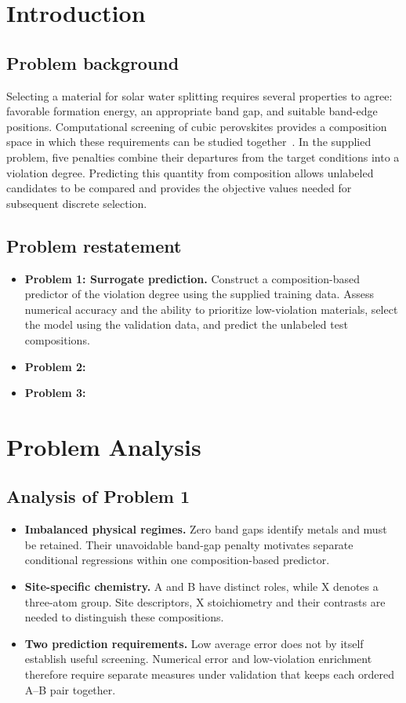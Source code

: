 \section{Introduction}
\subsection{Problem background}
Selecting a material for solar water splitting requires several properties to agree: favorable formation energy, an appropriate band gap, and suitable band-edge positions. Computational screening of cubic perovskites provides a composition space in which these requirements can be studied together~\cite{castelli2012}. In the supplied problem, five penalties combine their departures from the target conditions into a violation degree. Predicting this quantity from composition allows unlabeled candidates to be compared and provides the objective values needed for subsequent discrete selection.

\subsection{Problem restatement}
\begin{itemize}
  \item \textbf{Problem 1: Surrogate prediction.} Construct a composition-based predictor of the violation degree using the supplied training data. Assess numerical accuracy and the ability to prioritize low-violation materials, select the model using the validation data, and predict the unlabeled test compositions.
  \item \textbf{Problem 2:}
  \item \textbf{Problem 3:}
\end{itemize}

\section{Problem Analysis}
\subsection{Analysis of Problem 1}
\begin{itemize}
  \item \textbf{Imbalanced physical regimes.} Zero band gaps identify metals and must be retained. Their unavoidable band-gap penalty motivates separate conditional regressions within one composition-based predictor.
  \item \textbf{Site-specific chemistry.} A and B have distinct roles, while X denotes a three-atom group. Site descriptors, X stoichiometry and their contrasts are needed to distinguish these compositions.
  \item \textbf{Two prediction requirements.} Low average error does not by itself establish useful screening. Numerical error and low-violation enrichment therefore require separate measures under validation that keeps each ordered A--B pair together.
\end{itemize}
